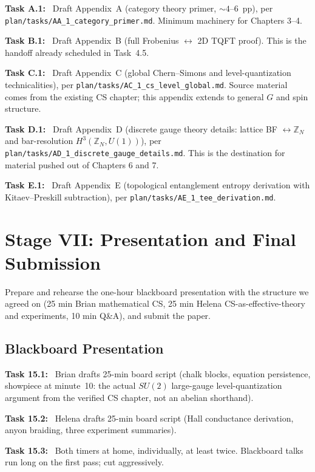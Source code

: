 \documentclass[11pt]{article}
\newcommand{\task}[1]{\medskip\noindent\textbf{Task #1:}\ }
\begin{document}
\task{A.1} Draft Appendix~A (category theory primer, $\sim 4$--$6$~pp), per
\texttt{plan/tasks/AA\_1\_category\_primer.md}. Minimum machinery for Chapters 3--4.

\task{B.1} Draft Appendix~B (full Frobenius $\leftrightarrow$ 2D TQFT proof). This is the
handoff already scheduled in Task~4.5.

\task{C.1} Draft Appendix~C (global Chern--Simons and level-quantization
technicalities), per \texttt{plan/tasks/AC\_1\_cs\_level\_global.md}. Source material
comes from the existing CS chapter; this appendix extends to general $G$ and spin
structure.

\task{D.1} Draft Appendix~D (discrete gauge theory details: lattice BF $\leftrightarrow
\mathbb{Z}_N$ and bar-resolution $H^3(\mathbb{Z}_N,U(1))$), per
\texttt{plan/tasks/AD\_1\_discrete\_gauge\_details.md}. This is the destination for
material pushed out of Chapters 6 and 7.

\task{E.1} Draft Appendix~E (topological entanglement entropy derivation with
Kitaev--Preskill subtraction), per \texttt{plan/tasks/AE\_1\_tee\_derivation.md}.

\section{Stage VII: Presentation and Final Submission}\label{sec:stageVII}

\begin{goalbox}[Objective]
Prepare and rehearse the one-hour blackboard presentation with the structure we agreed
on (25 min Brian mathematical CS, 25 min Helena CS-as-effective-theory and experiments,
10 min Q\&A), and submit the paper.
\end{goalbox}

\subsection{Blackboard Presentation}

\task{15.1} Brian drafts 25-min board script (chalk blocks, equation persistence,
showpiece at minute~10: the actual $SU(2)$ large-gauge level-quantization argument from
the verified CS chapter, not an abelian shorthand).

\task{15.2} Helena drafts 25-min board script (Hall conductance derivation, anyon
braiding, three experiment summaries).

\task{15.3} Both timers at home, individually, at least twice. Blackboard talks run
long on the first pass; cut aggressively.
\end{document}

